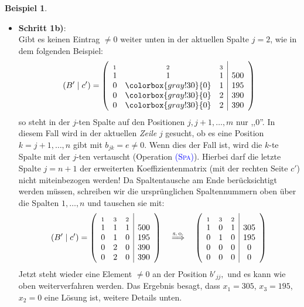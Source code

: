 \documentclass[a4paper,11pt,oneside]{article}
\theoremstyle{definition}
\newtheorem{example}{Beispiel}
\def\GB#1{\colorbox{gray!30}{#1}}
\def\OP#1{\textcolor{blue}{(\textnormal{\textrm{\textsc{#1}})}}}
\begin{document}
\begin{example}
\begin{enumerate}
\begin{itemize}
\item
\textbf{Schritt 1b)}:~\\
Gibt es keinen Eintrag $ \not=0$ weiter unten in der aktuellen Spalte $ j=2$, wie in dem folgenden Beispiel:
\[
(B'\mid c')=\left(\begin{array}{ccc|c}
_1&_2&_3&\\
1&1&1&500\\
0&\GB{0}&1&195\\
0&\GB{0}&2&390\\
0&\GB{0}&2&390\\
\end{array}\right)
\]
so steht in der $j$-ten Spalte auf den Positionen $j,j+1,\ldots,m$ nur ,,$0$''. In diesem Fall wird in der aktuellen \emph{Zeile} $j$ gesucht, ob es eine Position $k=j+1,\ldots,n$ gibt mit $b_{jk}=e\not=0$. Wenn dies der Fall ist, wird die $k$-te Spalte mit der $j$-ten vertauscht (Operation \OP{Spa}). Hierbei darf die letzte Spalte $j=n+1$ der erweiterten Koeffizientenmatrix (mit der rechten Seite $c'$) nicht miteinbezogen werden! Da Spaltentausche am Ende berücksichtigt werden müssen, schreiben wir die ursprünglichen Spaltennummern oben über die Spalten $1,\ldots,n$ und tauschen sie mit:
\[
(B'\mid c')=\left(\begin{array}{ccc|c}
_1&_3& _2&\\
1&1&1&500\\
0&1&{0}&195\\
0&2&{0}&390\\
0&2&{0}&390\\
\end{array}\right)
\quad \stackrel{\text{s.\,o.}}{\Longrightarrow}\quad
\left(\begin{array}{ccc|c}
_1&_3& _2&\\
1&0&1&305\\
0&1&{0}&195\\
0&0&{0}&0\\
0&0&{0}&0\\
\end{array}\right)
\]
Jetzt steht wieder eine Element $\neq0$ an der Position $b'_{jj},$ und es kann wie oben weiterverfahren werden. Das Ergebnis besagt, dass $x_1=305$, $x_3=195$, $x_2=0$ eine Lösung ist, weitere Details unten.


\end{itemize}
\end{enumerate}
\end{example}
\end{document}
